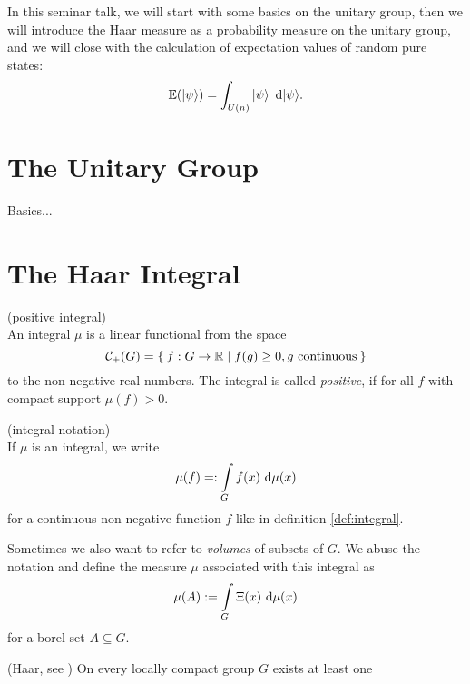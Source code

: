\documentclass[a4paper,11pt, BCOR=4mm, DIV=12, pagesize]{scrartcl}
\begin{document}
In this seminar talk, we will start with some basics on the unitary group, then 
we will introduce the Haar measure as a probability measure on the unitary 
group, and we will close with the calculation of expectation values of random 
pure states:
\begin{equation}
\mathbb{E}(\ket{\psi}) = \int_{U(n)} \ket{\psi}\ \mathrm{d} |\psi\rangle.
\end{equation}

\section{The Unitary Group}
Basics...

\section{The Haar Integral}

\begin{definition}\label{def:integral} (positive integral)\\
 An integral $\mu$ is a linear functional from the space 
 \begin{equation*}
 \mathcal{C}_+(G) = \Set{f: G\to\mathbb{R}| f(g)\geq 0, g\text{ continuous}} 
 \end{equation*}
 to the non-negative real numbers. The 
integral is called \emph{positive}, if for all $f$ with compact support 
$\mu(f)>0$.
\end{definition}

\begin{notation} (integral notation)\\
  If $\mu$ is an integral, we write
  \begin{equation}
   \mu(f) =: \int\limits_G f(x)\ \mathrm{d}\mu(x)
  \end{equation}
  for a continuous non-negative function $f$ like in definition 
  \ref{def:integral}. 
  
  Sometimes we also want to refer to \emph{volumes} of subsets of $G$. We abuse 
the notation and define the measure $\mu$ associated with this integral as \todo
  \begin{equation}
   \mu(A) := \int\limits_G \Xi(x)\ \mathrm{d}\mu(x)
  \end{equation}
  for a borel set $A\subseteq G$.
\end{notation}

\begin{thm} (Haar, see \cite{haar})
 On every locally compact group $G$ exists at least one 
\end{thm}
\end{document}
